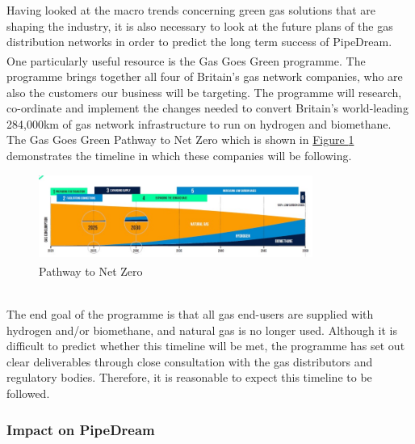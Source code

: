 \documentclass[11pt]{article}		%
\newcommand{\supercite}[1]{\textsuperscript{\cite{#1}}}		%
\newcommand{\figref}[1]{\hyperref[#1]{Figure \ref*{#1}}}    %
\begin{document}
    		Having looked at the macro trends concerning green gas solutions that are shaping the industry, it is also necessary to look at the future plans of the gas distribution networks in order to predict the long term success of PipeDream.
    		\\
        	\hspace*{3ex}One particularly useful resource is the Gas Goes Green programme\supercite{gasgoesgreen}. The programme brings together all four of Britain’s gas network companies, who are also the customers our business will be targeting. The programme will research, co-ordinate and implement the changes needed to convert Britain’s world-leading 284,000km of gas network infrastructure to run on hydrogen and biomethane. The Gas Goes Green Pathway to Net Zero which is shown in \figref{forecast} demonstrates the timeline in which these companies will be following.
    		\begin{figure}[h]
    			\centering
    			\includegraphics[width = 0.8\textwidth]{futureforecaset.jpg}
    			\caption{Pathway to Net Zero \supercite{gasgoesgreen} }	
    			\label{forecast}
    		\end{figure}
    		\\
            \hspace*{3ex}The end goal of the programme is that all gas end-users are supplied with hydrogen and/or biomethane, and natural gas is no longer used. Although it is difficult to predict whether this timeline will be met, the programme has set out clear deliverables through close consultation with the gas distributors and regulatory bodies. Therefore, it is reasonable to expect this timeline to be followed. 
            
    		\subsubsection[Impact on PipeDream]{Impact on PipeDream}
    		
\end{document}

